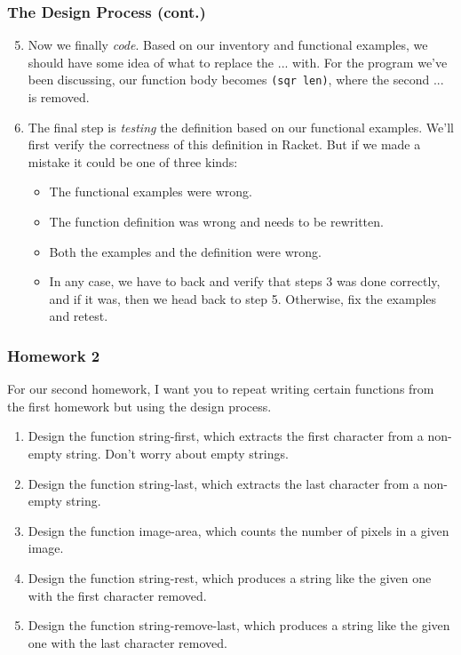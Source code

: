 \documentclass{beamer}
\begin{document}
\begin{frame}
  \frametitle{The Design Process (cont.)}
  \begin{enumerate}
    \setcounter{enumi}{4}
  \item<2-> Now we finally \emph{code}. Based on our inventory and functional examples, we should have some idea of what to replace the ... with.
    For the program we've been discussing, our function body becomes \texttt{(sqr len)}, where the second ... is removed.
  \item<3-> The final step is \emph{testing} the definition based on our functional examples.
    We'll first verify the correctness of this definition in Racket. But if we made a mistake it could be one of three kinds:
    \begin{itemize}
    \item<4-> The functional examples were wrong.
    \item<5-> The function definition was wrong and needs to be rewritten.
    \item<6-> Both the examples and the definition were wrong.
    \item<7-> In any case, we have to back and verify that steps 3 was done correctly, and if it was, then we head back to step 5. Otherwise, fix the examples and retest.
    \end{itemize}    
  \end{enumerate}
\end{frame}

\begin{frame}
  \frametitle{Homework 2}
  For our second homework, I want you to repeat writing certain functions from the first homework but using the
  design process.
  \begin{enumerate}
  \item Design the function string-first, which extracts the first character from a non-empty string. Don’t worry about empty strings.
  \item Design the function string-last, which extracts the last character from a non-empty string.
  \item Design the function image-area, which counts the number of pixels in a given image.
  \item Design the function string-rest, which produces a string like the given one with the first character removed.
  \item Design the function string-remove-last, which produces a string like the given one with the last character removed. 
  \end{enumerate}
\end{frame}
\end{document}
